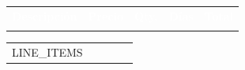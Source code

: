 \documentclass[a4paper,11pt]{article}
\newcommand{\LineItems}{%
{{LINE_ITEMS}}
}
\begin{document}
\vspace{0.35cm}

\renewcommand{\arraystretch}{1.55}
\setlength{\tabcolsep}{8pt}

{\setlength{\LTpre}{0pt}\setlength{\LTpost}{0pt}
\begin{tabularx}{\textwidth}{@{}>{\raggedright\arraybackslash}X
                            >{\raggedleft\arraybackslash}p{2.6cm}
                            >{\centering\arraybackslash}p{1.6cm}
                            >{\centering\arraybackslash}p{1.6cm}
                            >{\raggedleft\arraybackslash}p{2.8cm}@{}}
\rowcolor{brandOrange}
\textcolor{white}{\textbf{Descripción}} &
\textcolor{white}{\textbf{Precio}} &
\textcolor{white}{\textbf{Qty.}} &
\textcolor{white}{\textbf{Días}} &
\textcolor{white}{\textbf{Total}} \\
\addlinespace[-0.2em]
\arrayrulecolor{lineGray}\midrule
\end{tabularx}

{\setlength{\LTpre}{0pt}\setlength{\LTpost}{0pt}
\begin{longtable}{@{}>{\raggedright\arraybackslash}p{} 
        >{\raggedleft\arraybackslash}p{} 
        >{\centering\arraybackslash}p{} 
        >{\centering\arraybackslash}p{} 
        >{\raggedleft\arraybackslash}p{}@{}}
\arrayrulecolor{lineGray}
\endhead

\LineItems

\arrayrulecolor{lineGray}\midrule
\end{longtable}
}

\vspace{0.35cm}

}
\end{document}
